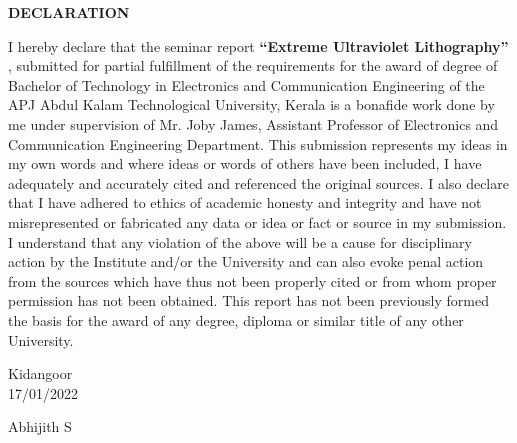 \documentclass[12pt,a4paper]{report}
\begin{document}
\thispagestyle{empty}
\newpage
\begin{center}
\textbf{DECLARATION}\\
\end{center}
I hereby declare that the seminar report \textbf{“Extreme Ultraviolet Lithography”} , 
submitted for partial fulfillment of the requirements for the award of degree of 
Bachelor of Technology in Electronics and Communication Engineering of the APJ 
Abdul Kalam Technological University, Kerala is a bonafide work done by me
under supervision of Mr. Joby James, Assistant Professor of Electronics and Communication Engineering Department. 
This submission represents my ideas in
 my own words and where ideas or words of others have been included, I 
 have adequately and accurately cited and referenced the original sources. 
 I also declare that I have adhered to ethics of academic honesty and 
 integrity and have not misrepresented or fabricated any data or idea 
 or fact or source in my submission. I understand that any violation 
 of the above will be a cause for disciplinary action by the Institute 
 and/or the University and can also evoke penal action from the sources 
 which have thus not been properly cited or from whom proper permission 
 has not been obtained. This report has not been previously formed the 
 basis for the award of any degree, diploma or similar title of any other 
 University.

\noindent \begin{minipage}{0.45\linewidth}
\begin{flushleft}
\vspace{1 cm}
                         
Kidangoor \\
17/01/2022\\

\end{flushleft} 
\end{minipage}
\hfill
\begin{minipage}{0.45\linewidth}
\begin{flushright}                                      
\vspace{1cm}
                         
Abhijith S\\


\end{flushright} 
\end{minipage}

\thispagestyle{empty}
\end{document}
